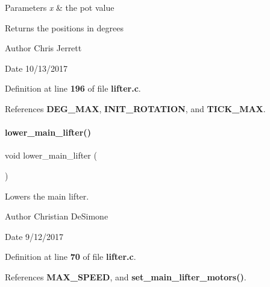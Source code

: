 \begin{DoxyParams}{Parameters}
{\em x} & the pot value \\
\hline
\end{DoxyParams}
\begin{DoxyReturn}{Returns}
the positions in degrees 
\end{DoxyReturn}
\begin{DoxyAuthor}{Author}
Chris Jerrett 
\end{DoxyAuthor}
\begin{DoxyDate}{Date}
10/13/2017 
\end{DoxyDate}


Definition at line \textbf{ 196} of file \textbf{ lifter.\+c}.



References \textbf{ D\+E\+G\+\_\+\+M\+AX}, \textbf{ I\+N\+I\+T\+\_\+\+R\+O\+T\+A\+T\+I\+ON}, and \textbf{ T\+I\+C\+K\+\_\+\+M\+AX}.

\mbox{\label{lifter_8h_ad36c37086a91046af4e6f619618b7719}} 
\paragraph{lower\+\_\+main\+\_\+lifter()}
{\footnotesize\ttfamily void lower\+\_\+main\+\_\+lifter (\begin{DoxyParamCaption}{ }\end{DoxyParamCaption})}



Lowers the main lifter. 

\begin{DoxyAuthor}{Author}
Christian De\+Simone 
\end{DoxyAuthor}
\begin{DoxyDate}{Date}
9/12/2017 
\end{DoxyDate}


Definition at line \textbf{ 70} of file \textbf{ lifter.\+c}.



References \textbf{ M\+A\+X\+\_\+\+S\+P\+E\+ED}, and \textbf{ set\+\_\+main\+\_\+lifter\+\_\+motors()}.

\mbox{\label{lifter_8h_af76abbd394bf206ab56fa237d776f2b3}} 
